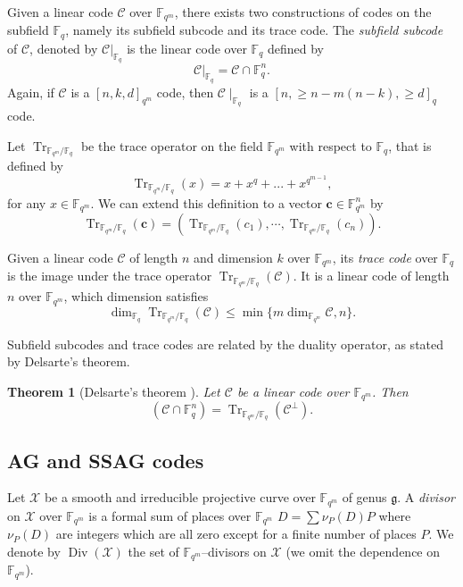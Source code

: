 \documentclass[a4paper]{article}
\newtheorem{thm}{Theorem}[section]
\theoremstyle{definition}
\theoremstyle{remark}
\newcommand{\calC}{\mathcal{C}}
\newcommand{\calX}{\mathcal{X}}
\newcommand{\fqm}{\mathbb{F}_{q^m}}
\newcommand{\fq}{\mathbb{F}_{q}}
\newcommand{\Tr}[1]{\operatorname{Tr}_{\mathbb{F}_{q^m}/\fq}\left(#1\right)}
\newcommand{\Div}{\operatorname{Div}}
\begin{document}
Given a linear code $\calC$ over $\fqm$, there exists two constructions of codes on the subfield $\fq$, namely its subfield subcode and its trace code. The \emph{subfield subcode} of $\calC$, denoted by $\calC|_{\fq}$ is the linear code over $\fq$ defined by 
\[\calC|_{\fq}=\calC \cap \mathbb{F}_q^n.\]
Again, if $\calC$ is a $[n,k,d]_{q^m}$ code, then $\calC\mid_{\fq}$ is a $[n,\geq n-m(n-k),\geq d]_q$ code.

Let $\operatorname{Tr}_{\mathbb{F}_{q^m}/\fq}$ be the trace operator on the field $\mathbb{F}_{q^m}$ with respect to $\mathbb{F}_q$, that is defined by
\[\Tr{x} = x + x^q + ... + x^{q^{m-1}},\]
for any $x \in \fqm$. We can extend this definition to a vector $\mathbf{c} \in \fqm^n$ by $$\Tr{\mathbf{c}}= (\Tr{c_1},\cdots,\Tr{c_n}).$$ 

\noindent Given a linear code $\calC$ of length $n$ and dimension $k$ over $\fqm$, its \emph{trace code} over $\fq$ is the image under the trace operator $\Tr{\calC}$. It is a linear code of length $n$ over $\fqm$, which dimension satisfies
\begin{equation}\label{eq:dim_trace}
\dim_{\mathbb{F}_q} \Tr{\calC} \leq \min\{m\dim_{\fqm} \calC,n\}.
\end{equation}

Subfield subcodes and trace codes are related by the duality operator, as stated by Delsarte's theorem.

\begin{thm}[Delsarte's theorem \cite{Del75}] \label{th:delsarte}
Let $\calC$ be a linear code over $\fqm$. Then
\[\left(\calC \cap \fq^n\right) = \Tr{\calC^{\perp}}.\]
\end{thm}

\subsection{AG and SSAG codes} \label{section:AG_codes}

Let $\calX$ be a smooth and irreducible projective curve over $\fqm$ of genus $\mathfrak{g}$. A \emph{divisor} on $\calX$ over $\fqm$ is a formal sum of places over $\fqm$ $D=\sum \nu_P(D) P$ where $\nu_P(D)$ are integers which are all zero except for a finite number of places $P$. We denote by $\Div(\calX)$ the set of $\fqm$--divisors on $\calX$ (we omit the dependence on $\fqm$).
\end{document}

